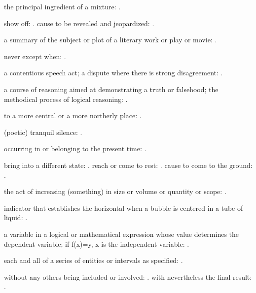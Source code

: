   the principal ingredient of a mixture: .

  show off:   . cause to be revealed and jeopardized: .

  a summary of the subject or plot of a literary work or play or movie:   .

  never except when:   .

  a contentious speech act; a dispute where there is strong disagreement:   .

  a course of reasoning aimed at demonstrating a truth or falsehood; the methodical process of logical reasoning:   .

  to a more central or a more northerly place: .

  (poetic) tranquil silence:   .

  occurring in or belonging to the present time: .

  bring into a different state:   . reach or come to rest:   . cause to come to the ground:   .

  the act of increasing (something) in size or volume or quantity or scope:   .

  indicator that establishes the horizontal when a bubble is centered in a tube of liquid:   .

  a variable in a logical or mathematical expression whose value determines the dependent variable; if f(x)=y, x is the independent variable: .

  each and all of a series of entities or intervals as specified: .

  without any others being included or involved:   . with nevertheless the final result: .

